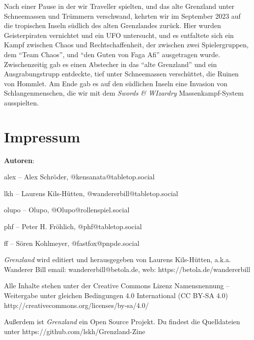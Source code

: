 \documentclass[11pt]{wbzine}
\begin{document}
\begin{multicols}{2}
Nach einer Pause in der wir Traveller spielten, und das alte
Grenzland unter Schneemassen und Trümmern verschwand, kehrten wir im
September 2023 auf die tropischen Inseln südlich des alten
Grenzlandes zurück. Hier wurden Geisterpiraten vernichtet und ein
UFO untersucht, und es entfaltete sich ein Kampf zwischen Chaos und
Rechtschaffenheit, der zwischen zwei Spielergruppen, dem ``Team
Chaos'', und ``den Guten von Faga Afi'' ausgetragen wurde.
Zwischenzeitig gab es einen Abstecher in das ``alte Grenzland'' und
ein Ausgrabungstrupp entdeckte, tief unter Schneemassen verschüttet,
die Ruinen von Hommlet. 
Am Ende gab es auf den südlichen Inseln
eine Invasion von Schlangenmenschen, die wir mit dem \textit{Swords
\& WIzardry} Massenkampf-System ausspielten.

\end{multicols}





\begin{multicols}{2}




\end{multicols}

\section{Impressum}

\textbf{Autoren}:

alex -- Alex Schröder, @kensanata@tabletop.social

lkh -- Laurens Kils-Hütten, @wandererbill@tabletop.social

olupo -- Olupo, @Olupo@rollenspiel.social

phf -- Peter H. Fröhlich, @phf@tabletop.social

ff -- Sören Kohlmeyer, @fastfox@pnpde.social

\textit{Grenzland} wird editiert und
herausgegeben von Laurens Kils-Hütten,
a.k.a. Wanderer Bill
email: wandererbill@betola.de, web: https://betola.de/wandererbill

Alle Inhalte stehen unter der Creative Commons Lizenz
Namensnennung -- Weitergabe unter gleichen Bedingungen 4.0 International (CC BY-SA 4.0)\\
http://creativecommons.org/licenses/by-sa/4.0/

Außerdem ist \textit{Grenzland} ein Open Source Projekt. Du
findest die Quelldateien unter
https://github.com/lskh/Grenzland-Zine

\end{document}

